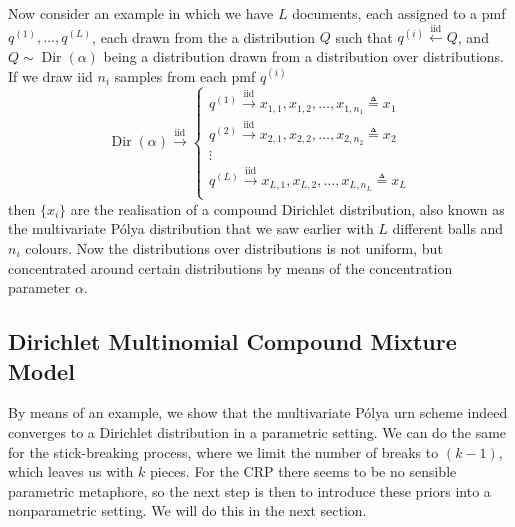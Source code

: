 Now consider an example in which we have $L$ documents, each assigned to a pmf $q^{(1)}, \ldots, q^{(L)}$, each drawn from the a distribution $Q$ such that $q^{(i)} \overset{\text{iid}}{\leftarrow} Q$, and $Q\sim\operatorname{Dir}(\alpha)$ being a distribution drawn from a distribution over distributions. If we draw iid $n_i$ samples from each pmf $q^{(i)}$
\begin{equation}
	\operatorname{Dir}(\alpha) \overset{\text{iid}}{\rightarrow}
    \begin{cases}
    q^{(1)} \overset{\text{iid}}{\rightarrow} x_{1,1}, x_{1,2},\ldots,x_{1,n_1} \triangleq x_1\\
    q^{(2)} \overset{\text{iid}}{\rightarrow} x_{2,1}, x_{2,2},\ldots,x_{2,n_2} \triangleq x_2 \\
    \vdots \\
    q^{(L)} \overset{\text{iid}}{\rightarrow} x_{L,1}, x_{L,2},\ldots,x_{L,n_L} \triangleq x_L \\
  \end{cases}
\end{equation}
then $\{x_i\}$ are the realisation of a compound Dirichlet distribution, also known as the multivariate P\'olya distribution that we saw earlier with $L$ different balls and $n_i$ colours. Now the distributions over distributions is not uniform, but concentrated around certain distributions by means of the concentration parameter $\alpha$.

\subsection{Dirichlet Multinomial Compound Mixture Model}

By means of an example, we show that the multivariate P\'olya urn scheme indeed converges to a Dirichlet distribution in a parametric setting. We can do the same for the stick-breaking process, where we limit the number of breaks to $(k-1)$, which leaves us with $k$ pieces. For the CRP there seems to be no sensible parametric metaphore, so the next step is then to introduce these priors into a nonparametric setting. We will do this in the next section.

